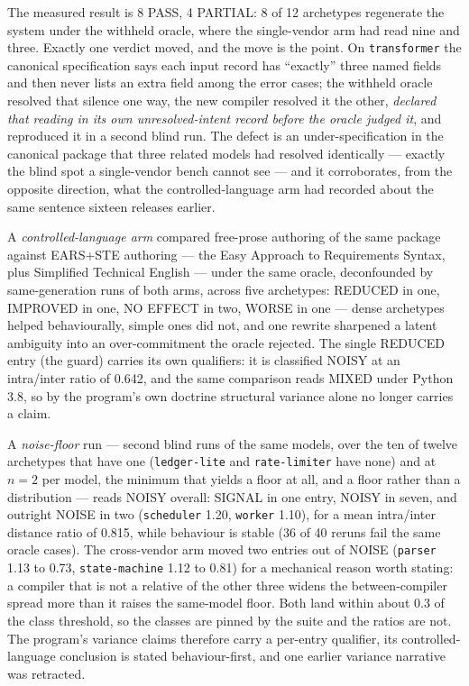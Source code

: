 \documentclass[11pt]{article}
\begin{document}
The measured result is 8 PASS, 4 PARTIAL: 8 of 12 archetypes regenerate the
system under the withheld oracle, where the single-vendor arm had read nine and
three. Exactly one verdict moved, and the move is
the point. On \texttt{transformer} the canonical specification says each input record
has ``exactly'' three named fields and then never lists an extra field among the error
cases; the withheld oracle resolved that silence one way, the new compiler resolved it
the other, \emph{declared that reading in its own unresolved-intent record before the
oracle judged it}, and reproduced it in a second blind run. The defect is an
under-specification in the canonical package that three related models had resolved
identically --- exactly the blind spot a single-vendor bench cannot see --- and it
corroborates, from the opposite direction, what the controlled-language arm had
recorded about the same sentence sixteen releases earlier.

A \emph{controlled-language arm} compared free-prose authoring of the same package
against EARS+STE authoring --- the Easy Approach to Requirements Syntax, plus
Simplified Technical English --- under the same oracle, deconfounded by
same-generation runs of both arms, across five archetypes: REDUCED in one, IMPROVED in
one, NO EFFECT in two, WORSE in one --- dense archetypes helped behaviourally, simple
ones did not, and one rewrite sharpened a latent ambiguity into an over-commitment the
oracle rejected. The single REDUCED entry (the guard) carries its own qualifiers: it is
classified NOISY at an intra/inter ratio of 0.642, and the same comparison reads MIXED
under Python 3.8, so by the program's own doctrine structural variance alone no longer
carries a claim.

A \emph{noise-floor} run --- second blind runs of the same models, over the ten of
twelve archetypes that have one (\texttt{ledger-lite} and \texttt{rate-limiter} have
none) and at $n=2$ per model, the minimum that yields a floor at all, and a floor
rather than a distribution --- reads NOISY overall: SIGNAL in one entry, NOISY in
seven, and outright NOISE in two (\texttt{scheduler} 1.20, \texttt{worker} 1.10), for
a mean intra/inter distance ratio of 0.815, while behaviour is stable (36 of 40 reruns
fail the same oracle cases). The cross-vendor arm moved two entries out of NOISE
(\texttt{parser} 1.13 to 0.73, \texttt{state-machine} 1.12 to 0.81) for a mechanical
reason worth stating: a compiler that is not a relative of the other three widens the
between-compiler spread more than it raises the same-model floor. Both land within
about 0.3 of the class threshold, so the classes are pinned by the suite and the ratios
are not. The program's variance claims therefore carry a per-entry qualifier, its
controlled-language conclusion is stated behaviour-first, and one earlier variance
narrative was retracted.
\end{document}

